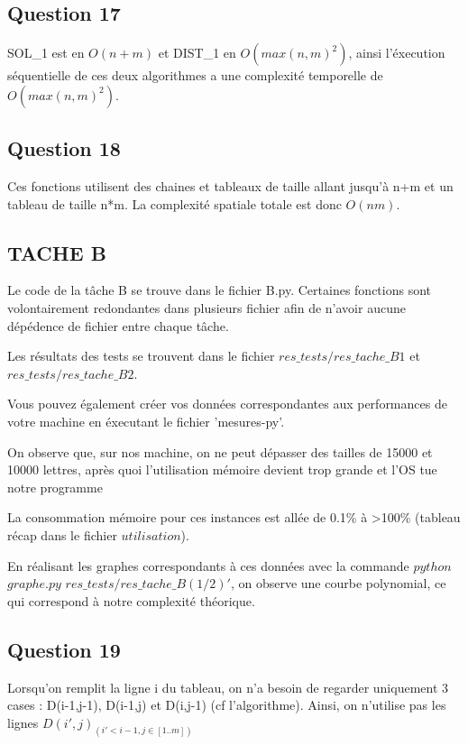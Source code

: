 \documentclass{report}
\begin{document}
\clearpage

\subsection*{Question 17}
SOL\_1 est en $O(n+m)$ et DIST\_1 en $O(max(n,m)^{2})$, ainsi l'éxecution séquentielle de ces deux algorithmes a une complexité temporelle de  $O(max(n,m)^{2})$.


\subsection*{Question 18}
Ces fonctions utilisent des chaines et tableaux de taille allant jusqu'à n+m et un tableau de taille n*m. La complexité spatiale totale est donc $O(nm)$.


 \begin{center}
 \subsection*{TACHE B}
Le code de la tâche B se trouve dans le fichier B.py. Certaines fonctions sont volontairement redondantes dans plusieurs fichier afin de n'avoir aucune dépédence de fichier entre chaque tâche.

Les résultats des tests se trouvent dans le fichier $res\_tests/res\_tache\_B1$ et $res\_tests/res\_tache\_B2$.

Vous pouvez également créer vos données correspondantes aux performances de votre machine en éxecutant le fichier 'mesures-py'.

On observe que, sur nos machine, on ne peut dépasser des tailles de 15000 et 10000 lettres, après quoi l'utilisation mémoire devient trop grande et l'OS tue notre programme

La consommation mémoire pour ces instances est allée de 0.1\% à >100\% (tableau récap dans le fichier $utilisation$).

En réalisant les graphes correspondants à ces données avec la commande  $python$ $graphe.py$ $res\_tests/res\_tache\_B(1/2)' $, on observe une courbe polynomial, ce qui correspond à notre complexité théorique.

 \end{center}
 
 \clearpage
 
 
\subsection*{Question 19}
Lorsqu'on remplit la ligne i du tableau, on n'a besoin de regarder uniquement 3 cases : D(i-1,j-1), D(i-1,j) et D(i,j-1) (cf l'algorithme).
Ainsi, on n'utilise pas les lignes $D(i',j)_{(i'<i-1, j\in[1..m])}$
\end{document}
